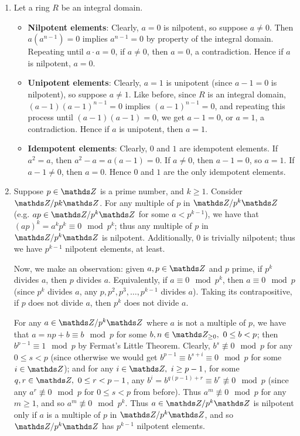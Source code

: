 \documentclass{homework}
\begin{document}
\begin{solution}
  \begin{enumerate}[label=(\alph*)]
    \item Let a ring $R$ be an integral domain.
      \begin{itemize}
        \item \textbf{Nilpotent elements}: Clearly, $a=0$ is nilpotent, so suppose $a\neq 0$.
      Then $a(a^{n-1})=0$ implies $a^{n-1}=0$ by property of the integral domain. Repeating until
      $a\cdot a=0$, if $a\neq 0$, then $a=0$, a contradiction. Hence if $a$ is nilpotent, $a=0$.

        \item \textbf{Unipotent elements}: Clearly, $a=1$ is unipotent (since $a-1=0$ is nilpotent),
          so suppose $a\neq 1$. Like before, since $R$ is an integral domain, $(a-1)(a-1)^{n-1}=0$
          implies $(a-1)^{n-1}=0$, and repeating this process until $(a-1)(a-1)=0$, we get $a-1=0$,
          or $a=1$, a contradiction. Hence if $a$ is unipotent, then $a=1$.

        \item \textbf{Idempotent elements}: Clearly, $0$ and $1$ are idempotent elements. If
          $a^2=a$, then $a^2-a=a(a-1)=0$. If $a\neq 0$, then $a-1=0$, so $a=1$. If $a-1\neq 0$, then
          $a=0$. Hence $0$ and $1$ are the only idempotent elements.
      \end{itemize}

    \item Suppose $p\in \Z$ is a prime number, and $k\ge 1$. Consider $\Z / pk\Z$. For any multiple
      of $p$ in $\Z / p^k\Z$ (e.g. $ap \in \Z / p^k\Z$ for some $a < p^{k-1}$), we have that
      $(ap)^k=a^kp^k\equiv 0\mod{p^k}$; thus any multiple of $p$ in $\Z / p^k\Z$ is nilpotent.
      Additionally, $0$ is trivially nilpotent; thus we have $p^{k-1}$ nilpotent elements, at least.

      Now, we make an observation: given $a,p\in \Z$ and $p$ prime, if $p^k$ divides $a$, then $p$ 
      divides $a$. Equivalently, if $a\equiv 0\mod{p^k}$, then $a\equiv 0\mod{p}$ (since $p^k$
      divides $a$, any $p,p^2,p^3,\ldots,p^{k-1}$ divides $a$). Taking its contrapositive, if $p$
      does not divide $a$, then $p^k$ does not divide $a$.

      For any $a\in \Z / p^k\Z$ where $a$ is not a multiple of $p$, we have that $a=np+b\equiv
      b\mod{p}$ for some $b,n\in \Z_{\ge 0},\ 0\le b<p$; then $b^{p-1}\equiv 1\mod{p}$ by Fermat's Little
      Theorem. Clearly, $b^s\not\equiv 0\mod{p}$ for any $0\le s<p$ (since otherwise we would get
      $b^{p-1}\equiv b^{s+i}\equiv 0\mod{p}$ for some $i\in \Z$); and for any $i\in \Z,\ i\ge
      p-1$, for some $q,r\in \Z,\ 0\le r<p-1$, any $b^i=b^{q(p-1)+r}\equiv b^r\not\equiv 0\mod{p}$ 
      (since any $a^r\not\equiv 0\mod{p}$ for $0\le s<p$ from before). Thus $a^m\not\equiv
      0\mod{p}$ for any $m\ge 1$, and so $a^m\not\equiv 0\mod{p^k}$. Thus $a\in \Z / p^k\Z$ is
      nilpotent only if $a$ is a multiple of $p$ in $\Z / p^k\Z$, and so $\Z / p^k\Z$ has
      $p^{k-1}$ nilpotent elements.


\end{enumerate}
\end{solution}
\end{document}
